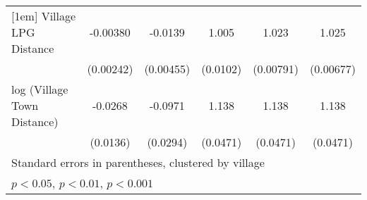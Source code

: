 {\begin{tabular}{l*{5}{c}}
[1em]
Village LPG Distance &    -0.00380         &     -0.0139\sym{**} &       1.005         &       1.023\sym{**} &       1.025\sym{***}\\
                    &   (0.00242)         &   (0.00455)         &    (0.0102)         &   (0.00791)         &   (0.00677)         \\
[1em]
log (Village Town Distance) &     -0.0268\sym{*}  &     -0.0971\sym{***}&       1.138\sym{**} &       1.138\sym{**} &       1.138\sym{**} \\
                    &    (0.0136)         &    (0.0294)         &    (0.0471)         &    (0.0471)         &    (0.0471)         \\
[1em]
\hline\hline
\multicolumn{6}{l}{\footnotesize Standard errors in parentheses, clustered by village}\\
\multicolumn{6}{l}{\footnotesize \sym{*} \(p<0.05\), \sym{**} \(p<0.01\), \sym{***} \(p<0.001\)}\\
\end{tabular}%
}